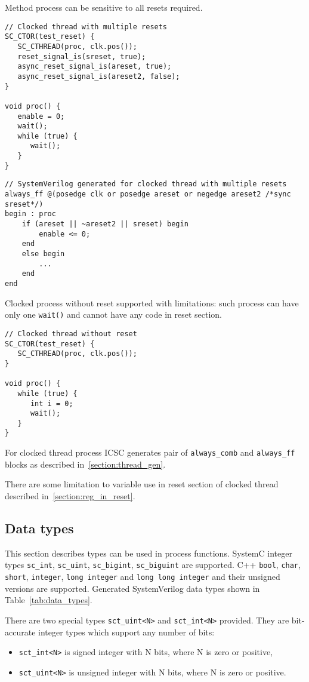 Method process can be sensitive to all resets required.

\begin{lstlisting}[style=mycpp]
// Clocked thread with multiple resets
SC_CTOR(test_reset) {
   SC_CTHREAD(proc, clk.pos());
   reset_signal_is(sreset, true);
   async_reset_signal_is(areset, true);
   async_reset_signal_is(areset2, false);       
}

void proc() {
   enable = 0;
   wait();
   while (true) {
      wait();
   }
}
\end{lstlisting}
%
\begin{lstlisting}[style=mycpp]
// SystemVerilog generated for clocked thread with multiple resets
always_ff @(posedge clk or posedge areset or negedge areset2 /*sync sreset*/) 
begin : proc
    if (areset || ~areset2 || sreset) begin
        enable <= 0;        
    end
    else begin
        ...
    end
end
\end{lstlisting}

Clocked process without reset supported with limitations: such process can have only one {\tt wait()} and cannot have any code in reset section.

\begin{lstlisting}[style=mycpp]
// Clocked thread without reset
SC_CTOR(test_reset) {
   SC_CTHREAD(proc, clk.pos());
}

void proc() {
   while (true) {
      int i = 0;
      wait();
   }
}
\end{lstlisting}

For clocked thread process ICSC generates pair of {\tt always\_comb} and {\tt always\_ff} blocks as described in~\ref{section:thread_gen}.

There are some limitation to variable use in reset section of clocked thread described in~\ref{section:reg_in_reset}.

\subsection{Data types}

This section describes types can be used in process functions. 
SystemC integer types {\tt sc\_int}, {\tt sc\_uint}, {\tt sc\_bigint}, {\tt sc\_biguint} are supported. C++ {\tt bool}, {\tt char}, {\tt short}, {\tt integer}, {\tt long integer} and {\tt long long integer} and their unsigned versions are supported. Generated SystemVerilog data types shown in Table~\ref{tab:data_types}.

There are two special types {\tt sct\_uint<N>} and {\tt sct\_int<N>} provided. They are bit-accurate integer types which support any number of bits:
\begin{itemize}
\item {\tt sct\_int<N>} is signed integer with N bits, where N is zero or positive,
\item {\tt sct\_uint<N>} is unsigned integer with N bits, where N is zero or positive.
\end{itemize}

